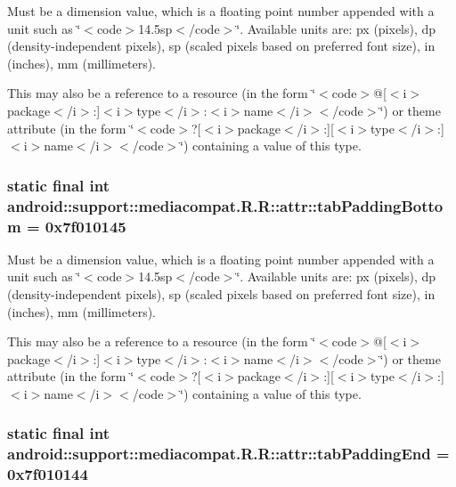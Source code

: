Must be a dimension value, which is a floating point number appended with a unit such as \char`\"{}$<$code$>$14.5sp$<$/code$>$\char`\"{}. Available units are: px (pixels), dp (density-independent pixels), sp (scaled pixels based on preferred font size), in (inches), mm (millimeters). 

This may also be a reference to a resource (in the form \char`\"{}$<$code$>$@\mbox{[}$<$i$>$package$<$/i$>$:\mbox{]}$<$i$>$type$<$/i$>$:$<$i$>$name$<$/i$>$$<$/code$>$\char`\"{}) or theme attribute (in the form \char`\"{}$<$code$>$?\mbox{[}$<$i$>$package$<$/i$>$:\mbox{]}\mbox{[}$<$i$>$type$<$/i$>$:\mbox{]}$<$i$>$name$<$/i$>$$<$/code$>$\char`\"{}) containing a value of this type. \hypertarget{classandroid_1_1support_1_1mediacompat_1_1_r_1_1attr_3c40b257a88983321f57887c698c7154}{
\subsubsection[{tabPaddingBottom}]{\setlength{\rightskip}{0pt plus 5cm}static final int android::support::mediacompat.R.R::attr::tabPaddingBottom = 0x7f010145}}
\label{classandroid_1_1support_1_1mediacompat_1_1_r_1_1attr_3c40b257a88983321f57887c698c7154}


Must be a dimension value, which is a floating point number appended with a unit such as \char`\"{}$<$code$>$14.5sp$<$/code$>$\char`\"{}. Available units are: px (pixels), dp (density-independent pixels), sp (scaled pixels based on preferred font size), in (inches), mm (millimeters). 

This may also be a reference to a resource (in the form \char`\"{}$<$code$>$@\mbox{[}$<$i$>$package$<$/i$>$:\mbox{]}$<$i$>$type$<$/i$>$:$<$i$>$name$<$/i$>$$<$/code$>$\char`\"{}) or theme attribute (in the form \char`\"{}$<$code$>$?\mbox{[}$<$i$>$package$<$/i$>$:\mbox{]}\mbox{[}$<$i$>$type$<$/i$>$:\mbox{]}$<$i$>$name$<$/i$>$$<$/code$>$\char`\"{}) containing a value of this type. \hypertarget{classandroid_1_1support_1_1mediacompat_1_1_r_1_1attr_c44bf2f7dee5c8630cc91e572bbc4418}{
\subsubsection[{tabPaddingEnd}]{\setlength{\rightskip}{0pt plus 5cm}static final int android::support::mediacompat.R.R::attr::tabPaddingEnd = 0x7f010144}}
\label{classandroid_1_1support_1_1mediacompat_1_1_r_1_1attr_c44bf2f7dee5c8630cc91e572bbc4418}


